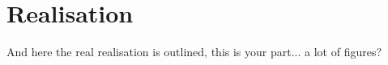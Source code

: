 \newpage
\chapter{Realisation}
And here the real realisation is outlined, this is your part... a lot of figures?
